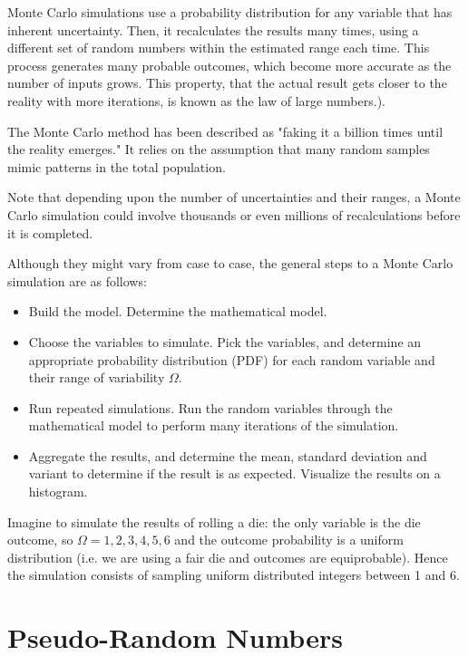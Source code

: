 Monte Carlo simulations use a probability distribution for any variable that has inherent uncertainty. Then, it recalculates the results many times, using a different set of random numbers within the estimated range each time. This process generates many probable outcomes, which become more accurate as the number of inputs grows. This property, that the actual result gets closer to the reality with more iterations, is known as the law of large numbers.).

The Monte Carlo method has been described as "faking it a billion times until the reality emerges."
It relies on the assumption that many random samples mimic patterns in the total population.


Note that depending upon the number of uncertainties and their ranges, a Monte Carlo simulation could involve thousands or even millions of recalculations before it is completed.

Although they might vary from case to case, the general steps to a Monte Carlo simulation are as follows:

\begin{itemize}
\item Build the model. Determine the mathematical model.
\item Choose the variables to simulate. Pick the variables, and determine an appropriate probability distribution (PDF) for each random variable and their range of variability $\Omega$.
\item Run repeated simulations. Run the random variables through the mathematical model to perform many iterations of the simulation.
\item Aggregate the results, and determine the mean, standard deviation and variant to determine if the result is as expected. Visualize the results on a histogram.
\end{itemize}

Imagine to simulate the results of rolling a die: the only variable is the die outcome, so $\Omega =1,2,3,4,5,6$ and the outcome probability is a uniform distribution (i.e. we are using a fair die and outcomes are equiprobable). Hence the simulation consists of sampling uniform distributed integers between 1 and 6.

\section{Pseudo-Random Numbers}
\label{pseudo-random-numbers}

